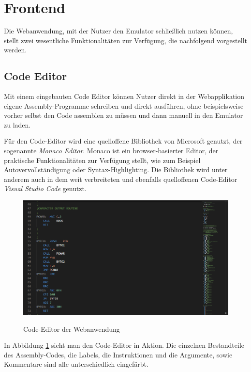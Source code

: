 \section{Frontend}

Die Webanwendung, mit der Nutzer den Emulator schließlich nutzen können, stellt zwei wesentliche Funktionalitäten zur Verfügung, die nachfolgend vorgestellt werden.

\subsection{Code Editor}

Mit einem eingebauten Code Editor können Nutzer direkt in der Webapplikation eigene Assembly-Programme schreiben und direkt ausführen, ohne beispielsweise vorher selbst den Code assemblen zu müssen und dann manuell in den Emulator zu laden.

Für den Code-Editor wird eine quelloffene Bibliothek von Microsoft genutzt, der sogenannte \textit{Monaco Editor}. Monaco ist ein browser-basierter Editor, der praktische Funktionalitäten zur Verfügung stellt, wie zum Beispiel Autovervollständigung oder Syntax-Highlighting. Die Bibliothek wird unter anderem auch in dem weit verbreiteten und ebenfalls quelloffenen Code-Editor \textit{Visual Studio Code} genutzt.

\begin{figure}
    \caption{Code-Editor der Webanwendung}
    \centering
    \includegraphics[width=1.0\textwidth]{Bilder/CodeEditor.png}
    \label{fig:codeeditor}
\end{figure}

In Abbildung \ref{fig:codeeditor} sieht man den Code-Editor in Aktion. Die einzelnen Bestandteile des Assembly-Codes, die Labels, die Instruktionen und die Argumente, sowie Kommentare sind alle unterschiedlich eingefärbt.

